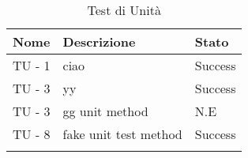 \begin{center}
\bgroup
\def\arraystretch{1.5}
\begin{longtable}{ | p{3cm} | p{9cm} | p{2cm} | }
\hline
\cellcolor[gray]{0.9} \textbf{Nome} & \cellcolor[gray]{0.9} \textbf{Descrizione} & \cellcolor[gray]{0.9} \textbf{Stato}
 \\ \hline
TU - 1 & ciao & Success \\ \hline
TU - 3 & yy & Success \\ \hline
TU - 3 & gg unit method  & N.E \\ \hline
TU - 8 & fake unit test method & Success \\ \hline
\caption{Test di Unità}
\end{longtable}
\egroup
\end{center}
